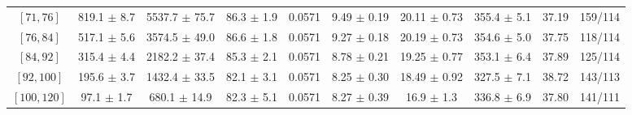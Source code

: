 \begin{tabular}{c||c|c|c|c|c|c|c||c|c}
$[71, 76]$ & 819.1 $\pm$ 8.7 & 5537.7 $\pm$ 75.7 & 86.3 $\pm$ 1.9 & 0.0571 & 9.49 $\pm$ 0.19 & 20.11 $\pm$ 0.73 & 355.4 $\pm$ 5.1 & 37.19 & 159/114\\
$[76, 84]$ & 517.1 $\pm$ 5.6 & 3574.5 $\pm$ 49.0 & 86.6 $\pm$ 1.8 & 0.0571 & 9.27 $\pm$ 0.18 & 20.19 $\pm$ 0.73 & 354.6 $\pm$ 5.0 & 37.75 & 118/114\\
$[84, 92]$ & 315.4 $\pm$ 4.4 & 2182.2 $\pm$ 37.4 & 85.3 $\pm$ 2.1 & 0.0571 & 8.78 $\pm$ 0.21 & 19.25 $\pm$ 0.77 & 353.1 $\pm$ 6.4 & 37.89 & 125/114\\
$[92, 100]$ & 195.6 $\pm$ 3.7 & 1432.4 $\pm$ 33.5 & 82.1 $\pm$ 3.1 & 0.0571 & 8.25 $\pm$ 0.30 & 18.49 $\pm$ 0.92 & 327.5 $\pm$ 7.1 & 38.72 & 143/113\\
$[100, 120]$ & 97.1 $\pm$ 1.7 & 680.1 $\pm$ 14.9 & 82.3 $\pm$ 5.1 & 0.0571 & 8.27 $\pm$ 0.39 & 16.9 $\pm$ 1.3 & 336.8 $\pm$ 6.9 & 37.80 & 141/111\\
\end{tabular}
